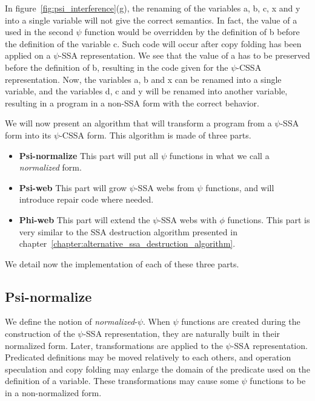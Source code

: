 In figure~\ref{fig:psi_interference}(g), the renaming of the variables
{a}, {b}, {c}, {x} and {y} into a single variable
will not give the correct semantics. In fact, the value of {a}
used in the second $\psi$ function would be overridden by the
definition of {b} before the definition of the variable {
  c}. Such code will occur after copy folding has been applied on a
$\psi$-SSA representation. We see that the value of {a} has to be
preserved before the definition of {b}, resulting in the code
given for the $\psi$-CSSA representation. Now, the variables {a},
{b} and {x} can be renamed into a single variable, and the
variables {d}, {c} and {y} will be renamed into another
variable, resulting in a program in a non-SSA form with the correct
behavior.

We will now present an algorithm that will transform a program from a
$\psi$-SSA form into its $\psi$-CSSA form. This algorithm is made of
three parts.

\begin{itemize}
\item {\bf Psi-normalize} This part will put all $\psi$ functions
in what we call a {\em normalized} form.
\item {\bf Psi-web} This part will grow $\psi$-SSA webs from $\psi$
  functions, and will introduce repair code where needed.
\item {\bf Phi-web} This part will extend the $\psi$-SSA webs with
  $\phi$ functions. This part is very similar to the SSA destruction
  algorithm presented in chapter~\ref{chapter:alternative_ssa_destruction_algorithm}.
\end{itemize}

We detail now the implementation of each of these three parts.

\subsection{Psi-normalize}

We define the notion of {\em normalized}-$\psi$. When $\psi$ functions
are created during the construction of the $\psi$-SSA representation,
they are naturally built in their normalized form. Later,
transformations are applied to the $\psi$-SSA representation.
Predicated definitions may be moved relatively to each others, and
operation speculation and copy folding may enlarge the domain of the
predicate used on the definition of a variable. These transformations
may cause some $\psi$ functions to be in a non-normalized form.

